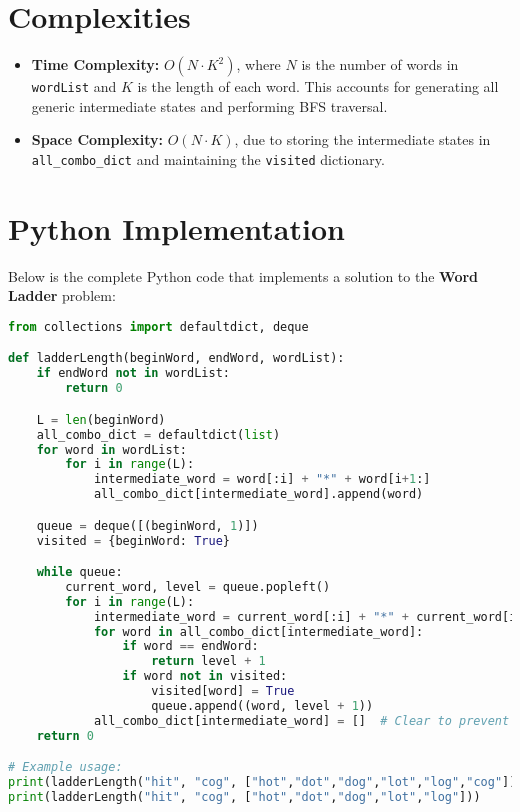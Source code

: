 
\section*{Complexities}

\begin{itemize}
    \item \textbf{Time Complexity:} \(O(N \cdot K^2)\), where \(N\) is the number of words in \texttt{wordList} and \(K\) is the length of each word. This accounts for generating all generic intermediate states and performing BFS traversal.
    \item \textbf{Space Complexity:} \(O(N \cdot K)\), due to storing the intermediate states in \texttt{all\_combo\_dict} and maintaining the \texttt{visited} dictionary.
\end{itemize}

\newpage %
\section*{Python Implementation}


Below is the complete Python code that implements a solution to the \textbf{Word Ladder} problem:

\begin{fullwidth}
\begin{lstlisting}[language=Python]
from collections import defaultdict, deque

def ladderLength(beginWord, endWord, wordList):
    if endWord not in wordList:
        return 0

    L = len(beginWord)
    all_combo_dict = defaultdict(list)
    for word in wordList:
        for i in range(L):
            intermediate_word = word[:i] + "*" + word[i+1:]
            all_combo_dict[intermediate_word].append(word)

    queue = deque([(beginWord, 1)])
    visited = {beginWord: True}

    while queue:
        current_word, level = queue.popleft()
        for i in range(L):
            intermediate_word = current_word[:i] + "*" + current_word[i+1:]
            for word in all_combo_dict[intermediate_word]:
                if word == endWord:
                    return level + 1
                if word not in visited:
                    visited[word] = True
                    queue.append((word, level + 1))
            all_combo_dict[intermediate_word] = []  # Clear to prevent re-processing
    return 0

# Example usage:
print(ladderLength("hit", "cog", ["hot","dot","dog","lot","log","cog"]))  # Output: 5
print(ladderLength("hit", "cog", ["hot","dot","dog","lot","log"]))         # Output: 0
\end{lstlisting}
\end{fullwidth}


